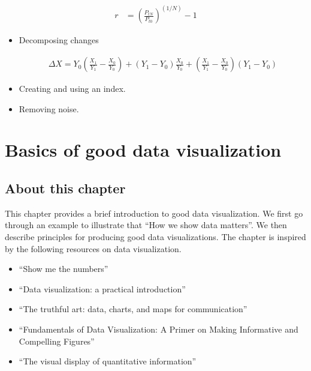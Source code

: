 \documentclass[]{book}
\providecommand{\tightlist}{%
  \setlength{\itemsep}{0pt}\setlength{\parskip}{0pt}}
\begin{document}
\begin{align}
   r&=\left(\frac{P_{tN}}{P_{t0}}\right)^{(1/N)}-1\nonumber
\end{align}

\begin{itemize}
\item
  Decomposing changes

  \begin{align}
  \Delta X=Y_0\left(\frac{X_1}{Y_1}-\frac{X_0}{Y_0}\right)+\left(Y_1-Y_0\right)\frac{X_0}{Y_0}+
  \left(\frac{X_1}{Y_1}-\frac{X_0}{Y_0}\right)\left(Y_1-Y_0\right)\nonumber
  \end{align}
\item
  Creating and using an index.
\item
  Removing noise.
\end{itemize}

\hypertarget{basics-of-good-data-visualization}{%
\chapter{Basics of good data visualization}\label{basics-of-good-data-visualization}}

\hypertarget{about-this-chapter-11}{%
\section{About this chapter}\label{about-this-chapter-11}}

This chapter provides a brief introduction to good data visualization. We first go through an example to illustrate that ``How we show data matters''. We then describe principles for producing good data visualizations. The chapter is inspired by the following resources on data visualization.

\begin{itemize}
\tightlist
\item
  ``Show me the numbers'' \citep{few2012show}
\item
  ``Data visualization: a practical introduction'' \citep{healy2018data}
\item
  ``The truthful art: data, charts, and maps for communication'' \citep{cairo}
\item
  ``Fundamentals of Data Visualization: A Primer on Making Informative and Compelling Figures'' \citep{wilke2019fundamentals}
\item
  ``The visual display of quantitative information'' \citep{tufte2001visual}
\end{itemize}
\end{document}
